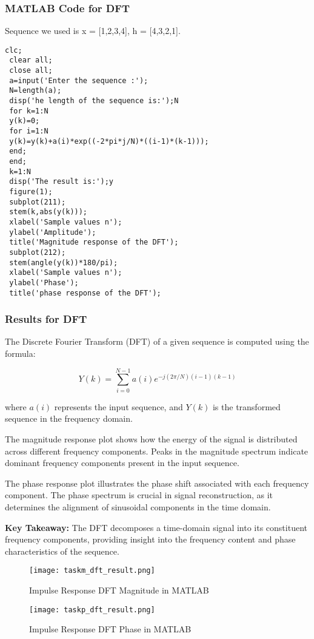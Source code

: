 \documentclass[a4paper,12pt]{article}
\begin{document}
\subsubsection{MATLAB Code for DFT}
Sequence we used is  x = [1,2,3,4], h = [4,3,2,1].

\begin{verbatim} 
clc;
 clear all;
 close all;
 a=input('Enter the sequence :');
 N=length(a);
 disp('he length of the sequence is:');N
 for k=1:N
 y(k)=0;
 for i=1:N
 y(k)=y(k)+a(i)*exp((-2*pi*j/N)*((i-1)*(k-1)));
 end;
 end;
 k=1:N
 disp('The result is:');y
 figure(1);
 subplot(211);
 stem(k,abs(y(k)));
 xlabel('Sample values n');
 ylabel('Amplitude');
 title('Magnitude response of the DFT');
 subplot(212);
 stem(angle(y(k))*180/pi);
 xlabel('Sample values n');
 ylabel('Phase');
 title('phase response of the DFT');
\end{verbatim}

\subsubsection{Results for DFT}
The Discrete Fourier Transform (DFT) of a given sequence is computed using the formula:

\[
Y(k) = \sum_{i=0}^{N-1} a(i) e^{-j(2\pi/N) (i-1)(k-1)}
\]

where \( a(i) \) represents the input sequence, and \( Y(k) \) is the transformed sequence in the frequency domain.

The magnitude response plot shows how the energy of the signal is distributed across different frequency components. Peaks in the magnitude spectrum indicate dominant frequency components present in the input sequence.

The phase response plot illustrates the phase shift associated with each frequency component. The phase spectrum is crucial in signal reconstruction, as it determines the alignment of sinusoidal components in the time domain.

\textbf{Key Takeaway:} The DFT decomposes a time-domain signal into its constituent frequency components, providing insight into the frequency content and phase characteristics of the sequence.
\begin{figure}[h]
    \centering
    \texttt{[image: taskm\_dft\_result.png]}
    \caption{Impulse Response DFT Magnitude in MATLAB}
    \label{fig:impulse_fft_result}
\end{figure}
\begin{figure}[h]
    \centering
    \texttt{[image: taskp\_dft\_result.png]}
    \caption{Impulse Response DFT Phase in MATLAB}
    \label{fig:impulse_fft_result}
\end{figure}
\end{document}
